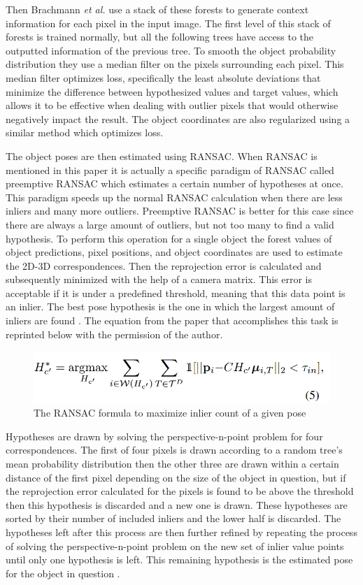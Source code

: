 \documentclass[12pt]{article}
\begin{document}
Then Brachmann \emph{et al.} use a stack of these forests to generate
context information for each pixel in the input image. The first level
of this stack of forests is trained normally, but all the following
trees have access to the outputted information of the previous tree. To
smooth the object probability distribution they use a median filter on
the pixels surrounding each pixel. This median filter optimizes loss,
specifically the least absolute deviations that minimize the difference
between hypothesized values and target values, which allows it to be
effective when dealing with outlier pixels that would otherwise
negatively impact the result. The object coordinates are also
regularized using a similar method which optimizes
loss\autocite{brachmann}.

The object poses are then estimated using RANSAC. When RANSAC is
mentioned in this paper it is actually a specific paradigm of RANSAC
called preemptive RANSAC which estimates a certain number of hypotheses
at once. This paradigm speeds up the normal RANSAC calculation when
there are less inliers and many more outliers. Preemptive RANSAC is
better for this case since there are always a large amount of outliers,
but not too many to find a valid hypothesis. To perform this operation
for a single object the forest values of object predictions, pixel
positions, and object coordinates are used to estimate the 2D-3D
correspondences. Then the reprojection error is calculated and
subsequently minimized with the help of a camera matrix. This error is
acceptable if it is under a predefined threshold, meaning that this data
point is an inlier. The best pose hypothesis is the one in which the
largest amount of inliers are found \autocite{brachmann}. The equation
from the paper that accomplishes this task is reprinted below with the
permission of the author.

\begin{figure}
\centering
\includegraphics{Pictures/eq5.png}
\caption{The RANSAC formula to maximize inlier count of a given pose}
\end{figure}

Hypotheses are drawn by solving the perspective-n-point problem for four
correspondences. The first of four pixels is drawn according to a random
tree's mean probability distribution then the other three are drawn
within a certain distance of the first pixel depending on the size of
the object in question, but if the reprojection error calculated for the
pixels is found to be above the threshold then this hypothesis is
discarded and a new one is drawn. These hypotheses are sorted by their
number of included inliers and the lower half is discarded. The
hypotheses left after this process are then further refined by repeating
the process of solving the perspective-n-point problem on the new set of
inlier value points until only one hypothesis is left. This remaining
hypothesis is the estimated pose for the object in question
\autocite{brachmann}.
\end{document}
